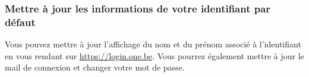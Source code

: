 \subsubsection{Mettre à jour les informations de votre identifiant par défaut}
Vous pouvez mettre à jour l'affichage du nom et du prénom associé à l'identifiant en vous rendant sur \url{https://login.one.be}. Vous pourrez également mettre à jour le mail de connexion et changer votre mot de passe.



\renewcommand{\thechapter}{\arabic{chapter}}









